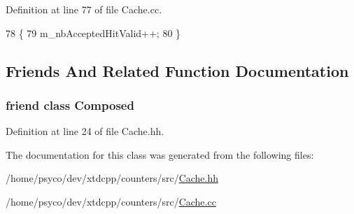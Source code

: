 Definition at line 77 of file Cache.\+cc.


\begin{DoxyCode}
78 \{
79   m\_nbAcceptedHitValid++;
80 \}
\end{DoxyCode}


\subsection{Friends And Related Function Documentation}
\subsubsection[{\texorpdfstring{Composed}{Composed}}]{\setlength{\rightskip}{0pt plus 5cm}friend class {\bf Composed}\hspace{0.3cm}{\ttfamily [friend]}}\hypertarget{classxtd_1_1counters_1_1Cache_a93e934ad70d5b32b14beed5572450abf}{}\label{classxtd_1_1counters_1_1Cache_a93e934ad70d5b32b14beed5572450abf}


Definition at line 24 of file Cache.\+hh.



The documentation for this class was generated from the following files\+:\begin{DoxyCompactItemize}
\item 
/home/psyco/dev/xtdcpp/counters/src/\hyperlink{Cache_8hh}{Cache.\+hh}\item 
/home/psyco/dev/xtdcpp/counters/src/\hyperlink{Cache_8cc}{Cache.\+cc}\end{DoxyCompactItemize}

